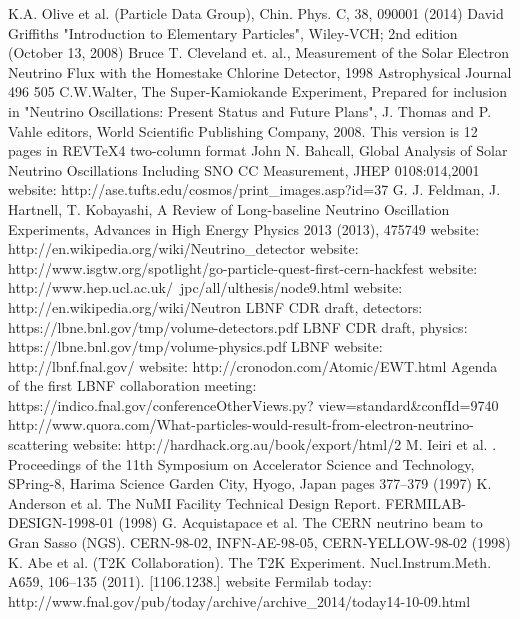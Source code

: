\begin{thebibliography}{1}
    K.A. Olive et al. (Particle Data Group), Chin. Phys. C, 38, 090001 (2014) 
    David Griffiths "Introduction to Elementary Particles", Wiley-VCH; 2nd edition (October 13, 2008)
    Bruce T. Cleveland et. al., Measurement of the Solar Electron Neutrino Flux with the Homestake Chlorine Detector, 1998 Astrophysical Journal 496 505
    C.W.Walter, The Super-Kamiokande Experiment, Prepared for inclusion in "Neutrino Oscillations: Present Status and Future Plans", J. Thomas and P. Vahle editors, World Scientific Publishing Company, 2008. This version is 12 pages in REVTeX4 two-column format
    John N. Bahcall, Global Analysis of Solar Neutrino Oscillations Including SNO CC Measurement, JHEP 0108:014,2001
    website: http://ase.tufts.edu/cosmos/print\_images.asp?id=37
    G. J. Feldman, J. Hartnell, T. Kobayashi, A Review of Long-baseline Neutrino Oscillation Experiments, Advances in High Energy Physics 2013 (2013), 475749
    website: http://en.wikipedia.org/wiki/Neutrino\_detector
    website: http://www.isgtw.org/spotlight/go-particle-quest-first-cern-hackfest
    website: http://www.hep.ucl.ac.uk/~jpc/all/ulthesis/node9.html
    website: http://en.wikipedia.org/wiki/Neutron
    LBNF CDR draft, detectors: https://lbne.bnl.gov/tmp/volume-detectors.pdf
    LBNF CDR draft, physics: https://lbne.bnl.gov/tmp/volume-physics.pdf
    LBNF website: http://lbnf.fnal.gov/
    website: http://cronodon.com/Atomic/EWT.html
    Agenda of the first LBNF collaboration meeting: https://indico.fnal.gov/conferenceOtherViews.py? view=standard\&confId=9740
   http://www.quora.com/What-particles-would-result-from-electron-neutrino-scattering
    website: http://hardhack.org.au/book/export/html/2
    M. Ieiri et al. . Proceedings of the 11th Symposium on Accelerator Science and Technology, SPring-8,
Harima Science Garden City, Hyogo, Japan pages 377–379 (1997)
    K. Anderson et al. The NuMI Facility Technical Design Report. FERMILAB-DESIGN-1998-01 (1998)
    G. Acquistapace et al. The CERN neutrino beam to Gran Sasso (NGS). CERN-98-02, INFN-AE-98-05,
CERN-YELLOW-98-02 (1998)
    K. Abe et al. (T2K Collaboration). The T2K Experiment. Nucl.Instrum.Meth. A659, 106–135 (2011).
[1106.1238.]
    website Fermilab today: http://www.fnal.gov/pub/today/archive/archive\_2014/today14-10-09.html
\end{thebibliography}
